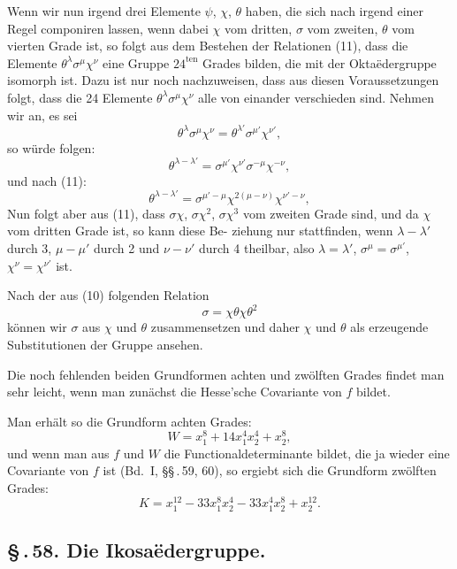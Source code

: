 \documentclass[12pt,a4paper]{article}
\theoremstyle{plain}
\theoremstyle{definition}
\theoremstyle{remark}
\newcommand{\sect}[1]{\S\,.\,#1.}
\begin{document}
Wenn wir nun irgend drei Elemente $\psi$, $\chi$, $\theta$ haben, die sich
nach irgend einer Regel componiren lassen, wenn dabei $\chi$ vom
dritten, $\sigma$ vom zweiten, $\theta$ vom vierten Grade ist, so folgt aus
dem Bestehen der Relationen (11), dass die Elemente $\theta^\lambda \sigma^\mu \chi^\nu$
eine Gruppe $24^{\text{ten}}$ Grades bilden, die mit der Okta\"edergruppe
isomorph ist. Dazu ist nur noch nachzuweisen, dass aus diesen
Voraussetzungen folgt, dass die 24 Elemente $\theta^\lambda \sigma^\mu \chi^\nu$ alle von
einander verschieden sind. Nehmen wir an, es sei
\[
\theta^\lambda \sigma^\mu \chi^\nu = \theta^{\lambda'} \sigma^{\mu'} \chi^{\nu'},
\]
so w\"urde folgen:
\[
\theta^{\lambda-\lambda'} = \sigma^{\mu'} \chi^{\nu'} \sigma^{-\mu} \chi^{-\nu},
\]
und nach (11):
\[
\theta^{\lambda-\lambda'} = \sigma^{\mu'-\mu} \chi^{2(\mu-\nu)} \chi^{\nu'-\nu},
\]
Nun folgt aber aus (11), dass $\sigma\chi$, $\sigma\chi^2$, $\sigma\chi^3$ vom zweiten
Grade sind, und da $\chi$ vom dritten Grade ist, so kann diese Be-
ziehung nur stattfinden, wenn $\lambda-\lambda'$ durch 3, $\mu-\mu'$ durch 2 und
$\nu-\nu'$ durch 4 theilbar, also $\lambda = \lambda'$, $\sigma^\mu = \sigma^{\mu'}$, $\chi^\nu = \chi^{\nu'}$ ist.

Nach der aus (10) folgenden Relation
\[
\sigma = \chi\theta\chi\theta^2
\]
k\"onnen wir $\sigma$ aus $\chi$ und $\theta$ zusammensetzen und daher $\chi$ und $\theta$
als erzeugende Substitutionen der Gruppe ansehen.

Die noch fehlenden beiden Grundformen achten und zw\"olften
Grades findet man sehr leicht, wenn man zun\"achst die Hesse'sche
Covariante von $f$ bildet.

Man erh\"alt so die Grundform achten Grades:
\begin{equation}\label{eq:57_13}
W = x_1^8 + 14x_1^4 x_2^4 + x_2^8,\tag{13}
\end{equation}
und wenn man aus $f$ und $W$ die Functionaldeterminante bildet,
die ja wieder eine Covariante von $f$ ist (Bd.~I, \S\S\,.\,59, 60), so
ergiebt sich die Grundform zw\"olften Grades:
\begin{equation}\label{eq:57_14}
K = x_1^{12} - 33x_1^8 x_2^4 - 33x_1^4 x_2^8 + x_2^{12}.\tag{14}
\end{equation}


\subsection*{\sect{58} Die Ikosa\"edergruppe.}
\end{document}

